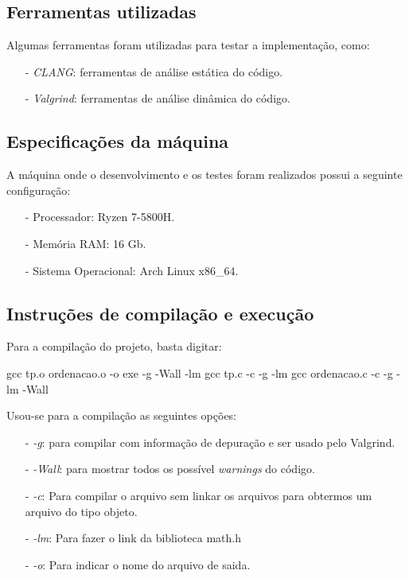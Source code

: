 \documentclass{article}
\begin{document}
\subsection{Ferramentas utilizadas}
Algumas ferramentas foram utilizadas para testar a implementação, como:

\begin{itemize}
    \item[-] \textit{CLANG}: ferramentas de análise estática do código.
    \item[-] \textit{Valgrind}: ferramentas de análise dinâmica do código.
\end{itemize}

\subsection{Especificações da máquina}
A máquina onde o desenvolvimento e os testes foram realizados possui a seguinte configuração:

\begin{itemize}
    \item[-] Processador: Ryzen 7-5800H.
    \item[-] Memória RAM: 16 Gb.
    \item[-] Sistema Operacional: Arch Linux x86\_64.
\end{itemize}


\subsection{Instruções de compilação e execução}

Para a compilação do projeto, basta digitar:

\begin{tcolorbox}[title=Compilando o projeto,width=\linewidth]
    gcc tp.o ordenacao.o -o exe -g -Wall -lm\newline
    gcc tp.c -c -g -lm\newline
    gcc ordenacao.c -c -g -lm -Wall\newline
\end{tcolorbox}

Usou-se para a compilação as seguintes opções:

\begin{itemize}
    \item [-] \emph{-g}: para compilar com informação de depuração e ser usado pelo Valgrind.
    \item [-] \emph{-Wall}: para mostrar todos os possível \emph{warnings} do código.
    \item [-] \emph{-c}: Para compilar o arquivo sem linkar os arquivos para obtermos um arquivo do tipo objeto.
    \item [-] \emph{-lm}: Para fazer o link da biblioteca math.h
    \item [-] \emph{-o}: Para indicar o nome do arquivo de saida.

\end{itemize}
\end{document}
